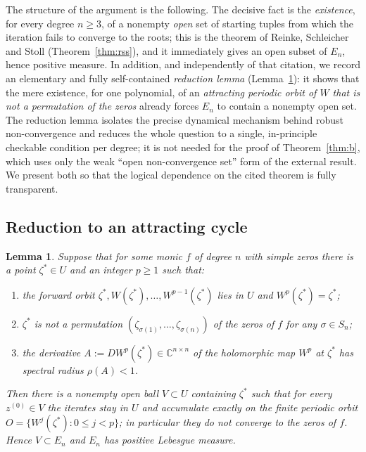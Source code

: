 \documentclass{amsart}
\newtheorem{lemma}{Lemma}
\theoremstyle{definition}
\theoremstyle{remark}
\newcommand{\C}{\mathbb{C}}
\begin{document}
The structure of the argument is the following. The decisive fact is the \emph{existence},
for every degree $n\ge3$, of a nonempty \emph{open} set of starting tuples from which the
iteration fails to converge to the roots; this is the theorem of Reinke, Schleicher and Stoll
(Theorem~\ref{thm:rss}), and it immediately gives an open subset of $E_n$, hence positive
measure. In addition, and independently of that citation, we record an elementary and fully
self-contained \emph{reduction lemma} (Lemma~\ref{lem:attr}): it shows that the mere
existence, for one polynomial, of an \emph{attracting periodic orbit of $W$ that is not a
permutation of the zeros} already forces $E_n$ to contain a nonempty open set. The reduction
lemma isolates the precise dynamical mechanism behind robust non-convergence and reduces the
whole question to a single, in-principle checkable condition per degree; it is not needed for
the proof of Theorem~\ref{thm:b}, which uses only the weak ``open non-convergence set'' form
of the external result. We present both so that the logical dependence on the cited theorem is
fully transparent.

\subsection{Reduction to an attracting cycle}

\begin{lemma}\label{lem:attr}
Suppose that for some monic $f$ of degree $n$ with simple zeros there is a point
$\zeta^{*}\in U$ and an integer $p\ge1$ such that:
\begin{enumerate}
\item the forward orbit $\zeta^{*},W(\zeta^{*}),\dots,W^{p-1}(\zeta^{*})$ lies in $U$ and
$W^{p}(\zeta^{*})=\zeta^{*}$;
\item $\zeta^{*}$ is \emph{not} a permutation
$(\zeta_{\sigma(1)},\dots,\zeta_{\sigma(n)})$ of the zeros of $f$ for any $\sigma\in S_n$;
\item the derivative $A:=DW^{p}(\zeta^{*})\in\C^{n\times n}$ of the holomorphic map $W^{p}$
at $\zeta^{*}$ has spectral radius $\rho(A)<1$.
\end{enumerate}
Then there is a nonempty open ball $V\subset U$ containing $\zeta^{*}$ such that for every
$z^{(0)}\in V$ the iterates stay in $U$ and accumulate exactly on the finite periodic orbit
$O=\{W^{j}(\zeta^{*}):0\le j<p\}$; in particular they do not converge to the zeros of $f$.
Hence $V\subset E_n$ and $E_n$ has positive Lebesgue measure.
\end{lemma}
\end{document}
